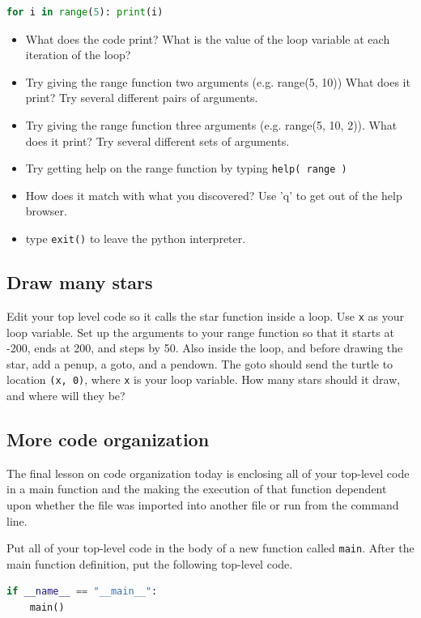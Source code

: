 \documentclass[12pt]{article}
\begin{document}
\begin{lstlisting}[language=Python]
for i in range(5): print(i)
\end{lstlisting}

\begin{itemize}
\item What does the code print? What is the value of the loop variable at each iteration of the loop?
\item Try giving the range function two arguments (e.g. range(5, 10)) What does it print? Try several different pairs of arguments.
\item Try giving the range function three arguments (e.g. range(5, 10, 2)). What does it print? Try several different sets of arguments.
\item Try getting help on the range function by typing \texttt{help( range )}
\item How does it match with what you discovered? Use 'q' to get out of the help browser.
\item type \texttt{exit()} to leave the python interpreter. 
\end{itemize}

\subsection{Draw many stars}
Edit your top level code so it calls the star function inside a loop. Use \texttt{x} as your loop variable. Set up the arguments to your range function so that it starts at -200, ends at 200, and steps by 50. Also inside the loop, and before drawing the star, add a penup, a goto, and a pendown. The goto should send the turtle to location \texttt{(x, 0)}, where \texttt{x} is your loop variable. How many stars should it draw, and where will they be?

\subsection{More code organization}
The final lesson on code organization today is enclosing all of your top-level code in a main function and the making the execution of that function dependent upon whether the file was imported into another file or run from the command line.

Put all of your top-level code in the body of a new function called \texttt{main}. After the main function definition, put the following top-level code.

\begin{lstlisting}[language=Python]
if __name__ == "__main__":
    main()
\end{lstlisting}
\end{document}
